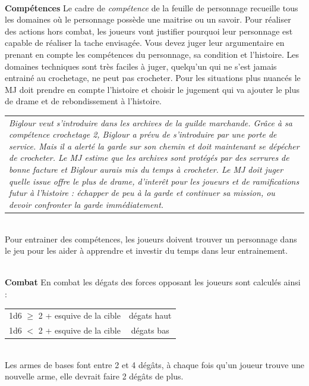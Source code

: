 \documentclass[11pt]{article} %
\newcommand{\myjump}[1][1]{\mbox{}\\[#1cm]}
\begin{document}
\myjump[0]
\textbf{Compétences}\newline
Le cadre de \emph{compétence} de la feuille de personnage recueille tous les domaines où le personnage possède une maitrise ou un savoir. Pour réaliser des actions hors combat, les joueurs vont justifier pourquoi leur personnage est capable de réaliser la tache envisagée. Vous devez juger leur argumentaire en prenant en compte les compétences du personnage, sa condition et l'histoire. Les domaines techniques sont très faciles à juger, quelqu'un qui ne s'est jamais entrainé au crochetage, ne peut pas crocheter. Pour les situations plus nuancés le MJ doit prendre en compte l'histoire et choisir le jugement qui va ajouter le plus de drame et de rebondissement à l'histoire.\newline\newline
\begin{tabularx}{\linewidth}{|X}
\emph{Biglour veut s'introduire dans les archives de la guilde marchande. Grâce à sa compétence crochetage 2, Biglour a prévu de s'introduire par une porte de service. Mais il a alerté la garde sur son chemin et doit maintenant se dépécher de crocheter. Le MJ estime que les archives sont protégés par des serrures de bonne facture et Biglour aurais mis du temps à crocheter. Le MJ doit juger quelle issue offre le plus de drame, d'interêt pour les joueurs et de ramifications futur à l'histoire : échapper de peu à la garde et continuer sa mission, ou devoir confronter la garde immédiatement. }\\
\end{tabularx}
\myjump[0.35]
Pour entrainer des compétences, les joueurs doivent trouver un personnage dans le jeu pour les aider à apprendre et investir du temps dans leur entrainement.

\myjump[0]
\textbf{Combat}\newline
En combat les dégats des forces opposant les joueurs sont calculés ainsi :

\noindent
\begin{tabular}{c|c}
    1d6 $\ge$ 2 + esquive de la cible & dégats haut \\
    1d6 $<$ 2 + esquive de la cible & dégats bas \\
\end{tabular}



\myjump[0.4]\noindent
Les armes de bases font entre 2 et 4 dégâts, à chaque fois qu'un joueur trouve une nouvelle arme, elle devrait faire 2 dégâts de plus.
\end{document}
